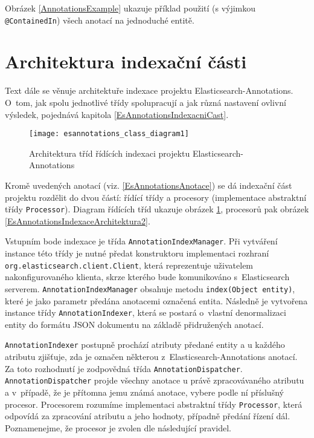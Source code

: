 \documentclass[11pt,oneside]{fithesis2}
\begin{document}
Obrázek \ref{AnnotationsExample} ukazuje příklad použití (s výjimkou \texttt{@ContainedIn}) všech anotací na jednoduché entitě.

\section{Architektura indexační části}
Text dále se věnuje architektuře indexace projektu Elasticsearch-Annotations. O~tom, jak spolu jednotlivé třídy spolupracují a jak různá nastavení ovlivní výsledek, pojednává kapitola \ref{EsAnnotationsIndexacniCast}.

\begin{figure}[h]
	\begin{center}
		\texttt{[image: esannotations\_class\_diagram1]}
	\end{center}
	\caption{Architektura tříd řídících indexaci projektu Elasticsearch-Annotations}	
	\label{EsAnnotationsIndexaceArchitektura1}
\end{figure}

Kromě uvedených anotací (viz. \ref{EsAnnotationsAnotace}) se dá indexační část projektu rozdělit do dvou částí: řídící třídy a procesory (implementace abstraktní třídy \texttt{Processor}). Diagram řídících tříd ukazuje obrázek \ref{EsAnnotationsIndexaceArchitektura1}, procesorů pak obrázek \ref{EsAnnotationsIndexaceArchitektura2}.

Vstupním bode indexace je třída \texttt{AnnotationIndexManager}. Při vytváření instance této třídy je nutné předat konstruktoru implementaci rozhraní \texttt{org.elasticsearch.client.Client}, která reprezentuje uživatelem nakonfigurovaného klienta, skrze kterého bude komunikováno s~Elasticsearch serverem. \texttt{AnnotationIndexManager} obsahuje metodu \texttt{index(Object entity)}, které je jako parametr předána anotacemi označená entita. Následně je vytvořena instance třídy \texttt{AnnotationIndexer}, která se postará o~vlastní denormalizaci entity do formátu JSON dokumentu na základě přidružených anotací.

\texttt{AnnotationIndexer} postupně prochází atributy předané entity a u každého atributu zjišťuje, zda je označen některou z~Elasticsearch-Annotations anotací. Za toto rozhodnutí je zodpovědná třída \texttt{AnnotationDispatcher}. \texttt{AnnotationDispatcher} projde všechny anotace u právě zpracovávaného atributu a v~případě, že je přítomna jemu známá anotace, vybere podle ní příslušný procesor. Procesorem rozumíme implementaci abstraktní třídy \texttt{Processor}, která odpovídá za  zpracování atributu a jeho hodnoty, případně předání řízení dál. Poznamenejme, že procesor je zvolen dle následující pravidel.
\end{document}
